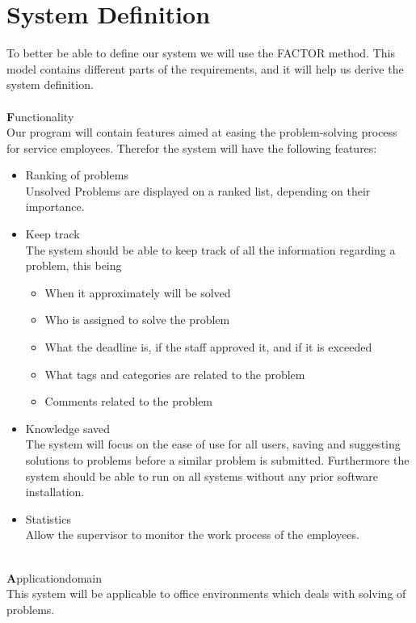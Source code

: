 \section{System Definition}
\label{sec:factor}
\label{sec:systemdefinition}
To better be able to define our system we will use the FACTOR method\cite[p.~39]{roedeaalborg}. This model contains different parts of the requirements, and it will help us derive the system definition.  \\
\ \\
{\Large \textbf{F}}unctionality \\
Our program will contain features aimed at easing the problem-solving process for service employees. Therefor the system will have the following features:
\begin{itemize}
\item Ranking of problems \\
Unsolved Problems are displayed on a ranked list, depending on their importance.
\item Keep track \\
The system should be able to keep track of all the information regarding a problem, this being
\begin{itemize}
	\item When it approximately will be solved
	\item Who is assigned to solve the problem
	\item What the deadline is, if the staff approved it, and if it is exceeded
	\item What tags and categories are related to the problem 
	\item Comments related to the problem
\end{itemize}
\item Knowledge saved \\
The system will focus on the ease of use for all users, saving and suggesting solutions to problems before a similar problem is submitted. Furthermore the system should be able to run on all systems without any prior software installation.
\item Statistics \\
Allow the supervisor to monitor the work process of the employees.
\end{itemize}
\ \\
{\Large \textbf{A}}pplicationdomain \\
This system will be applicable to office environments which deals with solving of problems.\\
